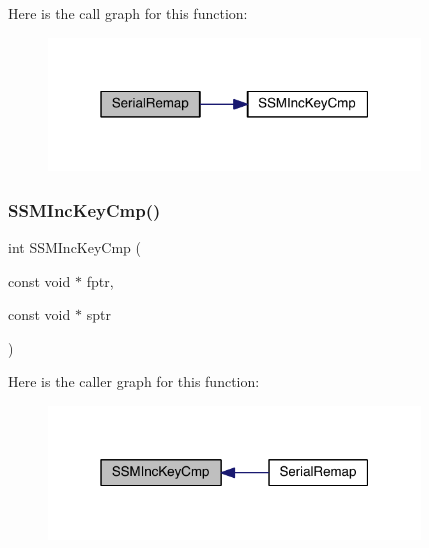 Here is the call graph for this function\+:\nopagebreak
\begin{figure}[H]
\begin{center}
\leavevmode
\includegraphics[width=280pt]{a00407_aa139665d0b90ebdcfc8e227a983994b2_cgraph}
\end{center}
\end{figure}
\mbox{\label{a00407_a786beb5cf2ec4aaae09596c302eb510d}} 
\subsubsection{\texorpdfstring{S\+S\+M\+Inc\+Key\+Cmp()}{SSMIncKeyCmp()}}
{\footnotesize\ttfamily int S\+S\+M\+Inc\+Key\+Cmp (\begin{DoxyParamCaption}\item[{const void $\ast$}]{fptr,  }\item[{const void $\ast$}]{sptr }\end{DoxyParamCaption})}

Here is the caller graph for this function\+:\nopagebreak
\begin{figure}[H]
\begin{center}
\leavevmode
\includegraphics[width=280pt]{a00407_a786beb5cf2ec4aaae09596c302eb510d_icgraph}
\end{center}
\end{figure}

